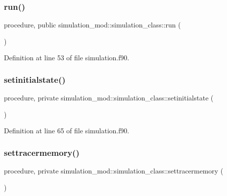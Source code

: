 \subsubsection{\texorpdfstring{run()}{run()}}
{\footnotesize\ttfamily procedure, public simulation\+\_\+mod\+::simulation\+\_\+class\+::run (\begin{DoxyParamCaption}{ }\end{DoxyParamCaption})}



Definition at line 53 of file simulation.\+f90.

\mbox{\label{structsimulation__mod_1_1simulation__class_aeb84b150c76e399c3dc33fbc3f7874ae}} 
\subsubsection{\texorpdfstring{setinitialstate()}{setinitialstate()}}
{\footnotesize\ttfamily procedure, private simulation\+\_\+mod\+::simulation\+\_\+class\+::setinitialstate (\begin{DoxyParamCaption}{ }\end{DoxyParamCaption})\hspace{0.3cm}{\ttfamily [private]}}



Definition at line 65 of file simulation.\+f90.

\mbox{\label{structsimulation__mod_1_1simulation__class_a7cabf864e327d6e35f6cb7bd85b1db6a}} 
\subsubsection{\texorpdfstring{settracermemory()}{settracermemory()}}
{\footnotesize\ttfamily procedure, private simulation\+\_\+mod\+::simulation\+\_\+class\+::settracermemory (\begin{DoxyParamCaption}{ }\end{DoxyParamCaption})\hspace{0.3cm}{\ttfamily [private]}}



